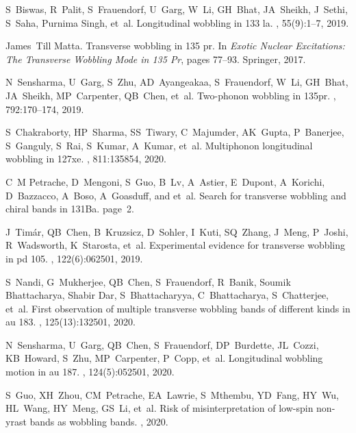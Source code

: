 \documentclass[11pt]{article}
\begin{document}
\begin{thebibliography}{99}
S~Biswas, R~Palit, S~Frauendorf, U~Garg, W~Li, GH~Bhat, JA~Sheikh, J~Sethi,
  S~Saha, Purnima Singh, et~al.
\newblock Longitudinal wobbling in 133 la.
, 55(9):1--7, 2019.

James~Till Matta.
\newblock Transverse wobbling in 135 pr.
\newblock In {\em Exotic Nuclear Excitations: The Transverse Wobbling Mode in
  135 Pr}, pages 77--93. Springer, 2017.

N~Sensharma, U~Garg, S~Zhu, AD~Ayangeakaa, S~Frauendorf, W~Li, GH~Bhat,
  JA~Sheikh, MP~Carpenter, QB~Chen, et~al.
\newblock Two-phonon wobbling in 135pr.
, 792:170--174, 2019.

S~Chakraborty, HP~Sharma, SS~Tiwary, C~Majumder, AK~Gupta, P~Banerjee,
  S~Ganguly, S~Rai, S~Kumar, A~Kumar, et~al.
\newblock Multiphonon longitudinal wobbling in 127xe.
, 811:135854, 2020.

C~M Petrache, D~Mengoni, S~Guo, B~Lv, A~Astier, E~Dupont, A~Korichi,
  D~Bazzacco, A~Boso, A~Goasduff, and et~al.
\newblock Search for transverse wobbling and chiral bands in 131Ba.
\newblock page~2.

J~Tim{\'a}r, QB~Chen, B~Kruzsicz, D~Sohler, I~Kuti, SQ~Zhang, J~Meng, P~Joshi,
  R~Wadsworth, K~Starosta, et~al.
\newblock Experimental evidence for transverse wobbling in pd 105.
, 122(6):062501, 2019.

S~Nandi, G~Mukherjee, QB~Chen, S~Frauendorf, R~Banik, Soumik Bhattacharya,
  Shabir Dar, S~Bhattacharyya, C~Bhattacharya, S~Chatterjee, et~al.
\newblock First observation of multiple transverse wobbling bands of different
  kinds in au 183.
, 125(13):132501, 2020.

N~Sensharma, U~Garg, QB~Chen, S~Frauendorf, DP~Burdette, JL~Cozzi, KB~Howard,
  S~Zhu, MP~Carpenter, P~Copp, et~al.
\newblock Longitudinal wobbling motion in au 187.
, 124(5):052501, 2020.

S~Guo, XH~Zhou, CM~Petrache, EA~Lawrie, S~Mthembu, YD~Fang, HY~Wu, HL~Wang,
  HY~Meng, GS~Li, et~al.
\newblock Risk of misinterpretation of low-spin non-yrast bands as wobbling
  bands.
, 2020.


\end{thebibliography}
\end{document}
